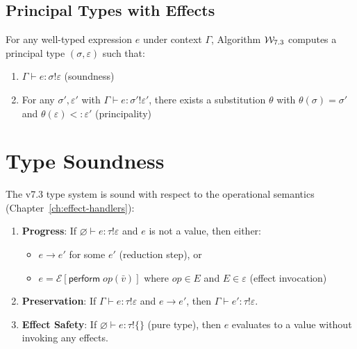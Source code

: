 \subsection{Principal Types with Effects}
\label{subsec:principal-effects}

\begin{theorem}
\label{thm:principal-effect}
For any well-typed expression $e$ under context $\Gamma$, Algorithm $\mathcal{W}_{7.3}$ computes a principal type $(\sigma, \varepsilon)$ such that:
\begin{enumerate}
  \item $\Gamma \vdash e : \sigma \mathbin{!} \varepsilon$ (soundness)
  \item For any $\sigma', \varepsilon'$ with $\Gamma \vdash e : \sigma' \mathbin{!} \varepsilon'$, there exists a substitution $\theta$ with $\theta(\sigma) = \sigma'$ and $\theta(\varepsilon) <: \varepsilon'$ (principality)
\end{enumerate}
\end{theorem}

\section{Type Soundness}
\label{sec:type-soundness}

\begin{theorem}
\label{thm:type-soundness}
The v7.3 type system is sound with respect to the operational semantics (Chapter~\ref{ch:effect-handlers}):
\begin{enumerate}
  \item \textbf{Progress}: If $\varnothing \vdash e : \tau \mathbin{!} \varepsilon$ and $e$ is not a value, then either:
    \begin{itemize}
      \item $e \to e'$ for some $e'$ (reduction step), or
      \item $e = \mathcal{E}[\mathsf{perform}\; \mathit{op}(\bar{v})]$ where $\mathit{op} \in E$ and $E \in \varepsilon$ (effect invocation)
    \end{itemize}
  \item \textbf{Preservation}: If $\Gamma \vdash e : \tau \mathbin{!} \varepsilon$ and $e \to e'$, then $\Gamma \vdash e' : \tau \mathbin{!} \varepsilon$.
  \item \textbf{Effect Safety}: If $\varnothing \vdash e : \tau \mathbin{!} \{\}$ (pure type), then $e$ evaluates to a value without invoking any effects.
\end{enumerate}
\end{theorem}

